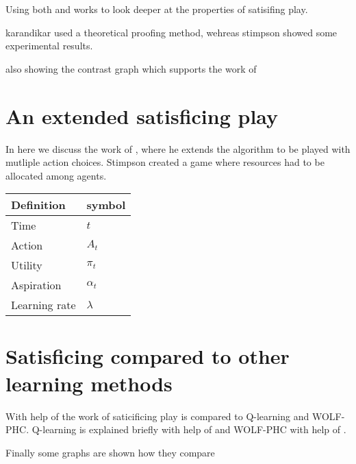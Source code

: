 Using both \citep{karandikar} and \citep{stimpson:2001} works to look deeper
at the properties of satisifing play. 

karandikar used a theoretical proofing method, wehreas stimpson showed some
experimental results.

also showing the contrast graph which supports the work of \citep{arthur}

\section{An extended satisficing play}
\drafting

In here we discuss the work of \citep{stimpson:2003}, where he extends the
algorithm to be played with mutliple action choices.
Stimpson created a game where resources had to be allocated among agents.


\begin{tabular}{ll}
  Definition & symbol \\ \toprule
  Time & $t$ \\
  Action & $A_t$ \\
  Utility & $\pi_t$ \\
  Aspiration & $\alpha_t$ \\
  Learning rate & $\lambda$ \\ \bottomrule
\end{tabular}

\section{Satisficing compared to other learning methods}
\drafting

With help of the work of \citep{crandall} saticificing play is compared
to Q-learning and WOLF-PHC.
Q-learning is explained briefly with help of \citep{sandholm} and WOLF-PHC
with help of \citep{bowling}.
 
Finally some graphs are shown how they compare



\address{Jappie Klooster\\
  Dept. of Informatics\\
  Universiteit Utrecht\\
  The Netherlands\\}
